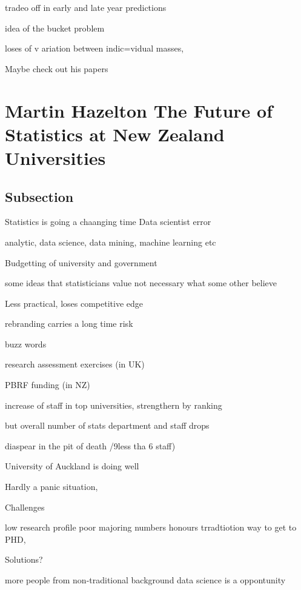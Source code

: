 \documentclass[
]{book}
\begin{document}
tradeo off in early and late year predictions

idea of the bucket problem

loses of v ariation between indic=vidual masses,

Maybe check out his papers

\hypertarget{martin-hazelton-the-future-of-statistics-at-new-zealand-universities}{%
\chapter*{Martin Hazelton \textbar{} The Future of Statistics at New Zealand Universities}\label{martin-hazelton-the-future-of-statistics-at-new-zealand-universities}}

\hypertarget{subsection}{%
\section{Subsection}\label{subsection}}

Statistics is going a chaanging time Data scientist error

analytic, data science, data mining, machine learning etc

Budgetting of university and government

some ideas that statisticians value not necessary what some other believe

Less practical, loses competitive edge

rebranding carries a long time risk

buzz words

research assessment exercises (in UK)

PBRF funding (in NZ)

increase of staff in top universities, strengthern by ranking

but overall number of stats department and staff drops

diaspear in the pit of death /9less tha 6 staff)

University of Auckland is doing well

Hardly a panic situation,

Challenges

low research profile
poor majoring numbers
honours trradtiotion way to get to PHD,

Solutions?

more people from non-traditional background
data science is a oppontunity
\end{document}
